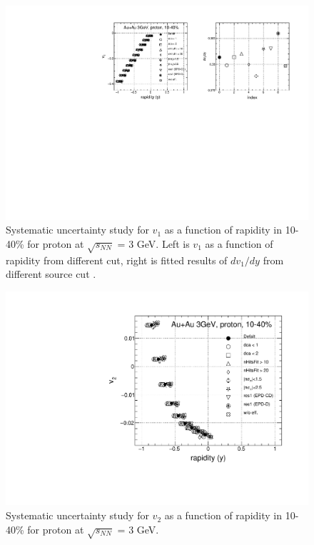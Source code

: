 \begin{figure}[h]
\includegraphics[scale=0.5]{chapter3/fig/sys/proton/v1y_pp_sys.pdf}
\caption{Systematic uncertainty study for $v_{1}$ as a function of rapidity in 10-40\% for proton at $\sqrt{s_{NN}}$ = 3 GeV. Left is $v_{1}$ as a function of rapidity from different cut, right is fitted results of $dv_{1}/dy$ from different source cut .}
\label{pion_v1y_sys}
\end{figure}

\begin{figure}[h]
\includegraphics[scale=0.4]{chapter3/fig/sys/proton/v2y_pp_sys.pdf}
\caption{Systematic uncertainty study for $v_{2}$ as a function of rapidity in 10-40\% for proton at $\sqrt{s_{NN}}$ = 3 GeV.}
\label{pion_v1y_sys}
\end{figure}

